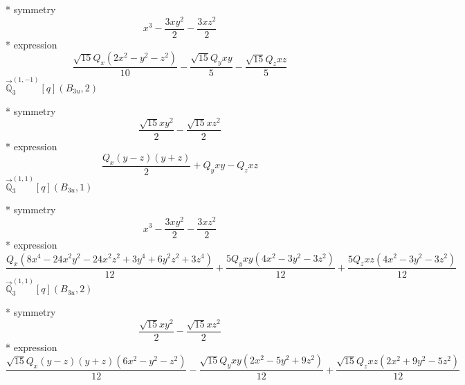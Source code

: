 \documentclass[fleqn,8pt]{jsarticle}
\begin{document}
\noindent\quad ** symmetry
\begin{dmath*}
x^{3} - \frac{3 x y^{2}}{2} - \frac{3 x z^{2}}{2}
\end{dmath*}
\noindent\quad ** expression
\begin{dmath*}
\frac{\sqrt{15} Q_{x} \left(2 x^{2} - y^{2} - z^{2}\right)}{10} - \frac{\sqrt{15} Q_{y} x y}{5} - \frac{\sqrt{15} Q_{z} x z}{5}
\end{dmath*}
\noindent\quad $\vec{\mathbb{Q}}_{3}^{(1,-1)}[q](B_{3u},2)$

\noindent\quad ** symmetry
\begin{dmath*}
\frac{\sqrt{15} x y^{2}}{2} - \frac{\sqrt{15} x z^{2}}{2}
\end{dmath*}
\noindent\quad ** expression
\begin{dmath*}
\frac{Q_{x} \left(y - z\right) \left(y + z\right)}{2} + Q_{y} x y - Q_{z} x z
\end{dmath*}
\noindent\quad $\vec{\mathbb{Q}}_{3}^{(1,1)}[q](B_{3u},1)$

\noindent\quad ** symmetry
\begin{dmath*}
x^{3} - \frac{3 x y^{2}}{2} - \frac{3 x z^{2}}{2}
\end{dmath*}
\noindent\quad ** expression
\begin{dmath*}
\frac{Q_{x} \left(8 x^{4} - 24 x^{2} y^{2} - 24 x^{2} z^{2} + 3 y^{4} + 6 y^{2} z^{2} + 3 z^{4}\right)}{12} + \frac{5 Q_{y} x y \left(4 x^{2} - 3 y^{2} - 3 z^{2}\right)}{12} + \frac{5 Q_{z} x z \left(4 x^{2} - 3 y^{2} - 3 z^{2}\right)}{12}
\end{dmath*}
\noindent\quad $\vec{\mathbb{Q}}_{3}^{(1,1)}[q](B_{3u},2)$

\noindent\quad ** symmetry
\begin{dmath*}
\frac{\sqrt{15} x y^{2}}{2} - \frac{\sqrt{15} x z^{2}}{2}
\end{dmath*}
\noindent\quad ** expression
\begin{dmath*}
\frac{\sqrt{15} Q_{x} \left(y - z\right) \left(y + z\right) \left(6 x^{2} - y^{2} - z^{2}\right)}{12} - \frac{\sqrt{15} Q_{y} x y \left(2 x^{2} - 5 y^{2} + 9 z^{2}\right)}{12} + \frac{\sqrt{15} Q_{z} x z \left(2 x^{2} + 9 y^{2} - 5 z^{2}\right)}{12}
\end{dmath*}
\end{document}
